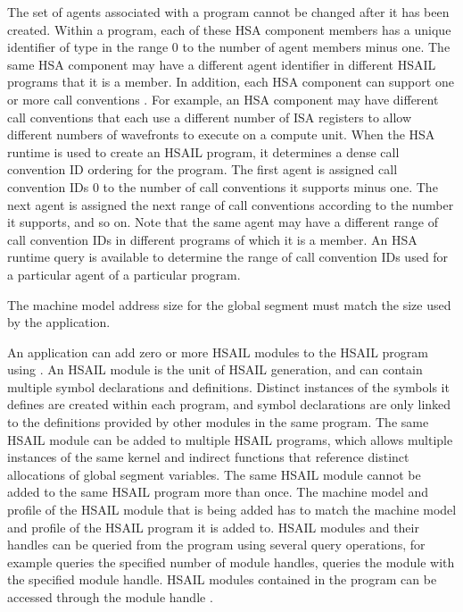 \documentclass[final,oneside]{book}
\begin{document}
The set of agents associated with a program cannot be changed after it has been
created. Within a program, each of these HSA component members has a unique
identifier of type  in the range 0 to the
number of agent members minus one. The same HSA component may have a different
agent identifier in different HSAIL programs that it is a member. In addition,
each HSA component can support one or more call conventions
. For example, an HSA component
may have different call conventions that each use a different number of ISA
registers to allow different numbers of wavefronts to execute on a compute unit.
When the HSA runtime is used to create an HSAIL program, it determines a dense
call convention ID ordering for the program. The first agent is assigned call
convention IDs 0 to the number of call conventions it supports minus one.  The
next agent is assigned the next range of call conventions according to the
number it supports, and so on. Note that the same agent may have a different
range of call convention IDs in different programs of which it is a member. An
HSA runtime query  is available to
determine the range of call convention IDs used for a particular agent of a
particular program.

The machine model address size for the global segment must match the size used
by the application.

An application can add zero or more HSAIL modules 
to the HSAIL program using . An HSAIL module is the
unit of HSAIL generation, and can contain multiple symbol declarations and
definitions. Distinct instances of the symbols it defines are created within
each program, and symbol declarations are only linked to the definitions
provided by other modules in the same program. The same HSAIL module can be
added to multiple HSAIL programs, which allows multiple instances of the same
kernel and indirect functions that reference distinct allocations of global
segment variables.  The same HSAIL module cannot be added to the same HSAIL
program more than once. The machine model and profile of the HSAIL module that
is being added has to match the machine model and profile of the HSAIL program
it is added to. HSAIL modules and their handles can be queried from the program
using several query operations, for example
 queries the specified number of module
handles,  queries the module with the
specified module handle. HSAIL modules contained in the program can be accessed
through the module handle .
\end{document}
